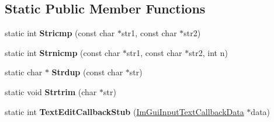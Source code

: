 \subsection*{Static Public Member Functions}
\begin{DoxyCompactItemize}
\item 
\mbox{\label{structExampleAppConsole_a6e5e5d66e77618eff0f89785261c9391}} 
static int {\bfseries Stricmp} (const char $\ast$str1, const char $\ast$str2)
\item 
\mbox{\label{structExampleAppConsole_a11bcb7a4b801e5eeb0c098c082fedc25}} 
static int {\bfseries Strnicmp} (const char $\ast$str1, const char $\ast$str2, int n)
\item 
\mbox{\label{structExampleAppConsole_a61d0da41ef31ea8690b23681a1e54dba}} 
static char $\ast$ {\bfseries Strdup} (const char $\ast$str)
\item 
\mbox{\label{structExampleAppConsole_af9a1afa791f9bd14701bed396b09de1c}} 
static void {\bfseries Strtrim} (char $\ast$str)
\item 
\mbox{\label{structExampleAppConsole_a394debe3cbf3cfd93b9bfd2835a4fdec}} 
static int {\bfseries Text\+Edit\+Callback\+Stub} (\hyperlink{structImGuiInputTextCallbackData}{Im\+Gui\+Input\+Text\+Callback\+Data} $\ast$data)
\end{DoxyCompactItemize}
